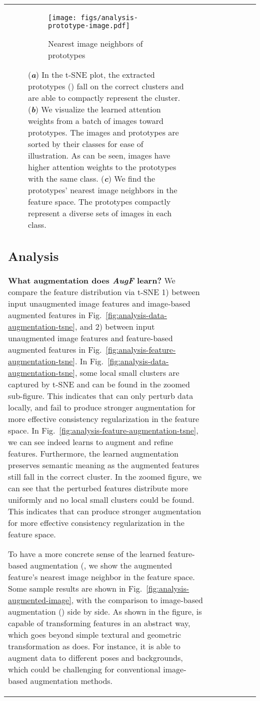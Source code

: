 \documentclass[runningheads]{llncs}
\begin{document}
\begin{table*}[t]
{\begin{tabular}{@{\extracolsep{4pt}}lcccccc@{}}
{\begin{figure}[t]
\begin{subfigure}{0.9\textwidth}
  \centering
  \texttt{[image: figs/analysis-prototype-image.pdf]}
  \caption{Nearest image neighbors of prototypes}
  \label{fig:analysis-prototype-image}
\end{subfigure}
\caption{
(\textit{\textbf{a}}) In the t-SNE plot, the extracted prototypes () fall on the correct clusters and are able to compactly represent the cluster.
(\textit{\textbf{b}}) We visualize the learned attention weights from a batch of images toward prototypes.
The images and prototypes are sorted by their classes for ease of illustration.
As can be seen, images have higher attention weights to the prototypes with the same class.
(\textit{\textbf{c}}) We find the prototypes' nearest image neighbors in the feature space.
The prototypes compactly represent a diverse sets of images in each class.
}
\label{fig:analysis-augf}
\end{figure}

\subsection{Analysis}\label{section:analysis}
\textbf{What augmentation does \textit{AugF} learn?}
We compare the feature distribution via t-SNE 1) between input unaugmented image features and image-based augmented features in Fig.~\ref{fig:analysis-data-augmentation-tsne}, and 2) between input unaugmented image features and feature-based augmented features in Fig.~\ref{fig:analysis-feature-augmentation-tsne}.
In Fig.~\ref{fig:analysis-data-augmentation-tsne}, some local small clusters are captured by t-SNE and can be found in the zoomed sub-figure.
This indicates that  can only perturb data locally, and fail to produce stronger augmentation for more effective consistency regularization in the feature space.
In Fig.~\ref{fig:analysis-feature-augmentation-tsne}, we can see  indeed learns to augment and refine features.
Furthermore, the learned augmentation preserves semantic meaning as the augmented features still fall in the correct cluster.
In the zoomed figure, we can see that the perturbed features distribute more uniformly and no local small clusters could be found.
This indicates that  can produce stronger augmentation for more effective consistency regularization in the feature space.

To have a more concrete sense of the learned feature-based augmentation (, we show the augmented feature's nearest image neighbor in the feature space.
Some sample results are shown in Fig.~\ref{fig:analysis-augmented-image}, with the comparison to image-based augmentation () side by side.
As shown in the figure,  is capable of transforming features in an abstract way, which goes beyond simple textural and geometric transformation as  does.
For instance, it is able to augment data to different poses and backgrounds, which could be challenging for conventional image-based augmentation methods.

}
\end{tabular}}
\end{table*}
\end{document}
